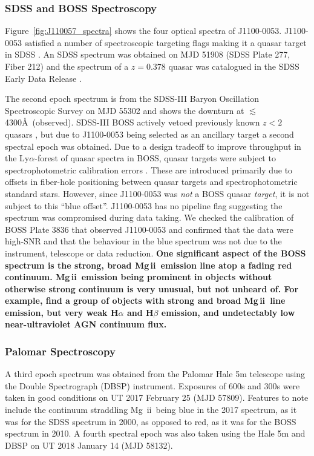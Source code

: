 \documentclass[a4paper,fleqn,usenatbib]{mnras}
\begin{document}
\subsubsection{SDSS and BOSS Spectroscopy}

Figure~\ref{fig:J110057_spectra} shows the four optical spectra of
J1100-0053. J1100-0053 satisfied a number of spectroscopic targeting
flags making it a quasar target in SDSS \citep{Richards2002}. An SDSS
spectrum was obtained on MJD 51908 (SDSS Plate 277, Fiber 212) and the
spectrum of a $z=0.378$ quasar was catalogued in the SDSS Early Data
Release \citep{Stoughton2002, Schneider2002}.

The second epoch spectrum is from the SDSS-III Baryon Oscillation
Spectroscopic Survey \citep[BOSS; ][]{Dawson2013} on MJD 55302 and
shows the downturn at $\lesssim$4300\AA\ (observed). SDSS-III BOSS
actively vetoed previously known $z<2$ quasars \citep{Ross2012}, but
due to J1100-0053 being selected as an ancillary target \citep[via a
white dwarf program;][]{Kepler2015, Kepler2016} a second spectral
epoch was obtained. Due to a design tradeoff to improve throughput in
the Ly$\alpha$-forest of quasar spectra in BOSS, quasar targets were
subject to spectrophotometric calibration errors
\citep{Margala2016}. These are introduced primarily due to offsets in
fiber-hole positioning between quasar targets and spectrophotometric
standard stars. However, since J1100-0053 was {\it not} a BOSS quasar
{\it target}, it is not subject to this ``blue offset''. J1100-0053
has no pipeline flag suggesting the spectrum was compromised during
data taking. We checked the calibration of BOSS Plate 3836 that
observed J1100-0053 and confirmed that the data were high-SNR and that
the behaviour in the blue spectrum was not due to the instrument,
telescope or data reduction.  {\bf One significant aspect of the BOSS
spectrum is the strong, broad Mg\,{\sc ii}\ emission line atop a
fading red continuum.  Mg\,{\sc ii}\ emission being prominent in
objects without otherwise strong continuum is very unusual, but not
unheard of.  For example, \citet{Roig2014} find a group of objects
with strong and broad Mg\,{\sc ii}\ line emission, but very weak
H$\alpha$ and H$\beta$ emission, and undetectably low near-ultraviolet
AGN continuum flux.}

\subsubsection{Palomar Spectroscopy} 
A third epoch spectrum was obtained from the Palomar Hale 5m telescope
using the Double Spectrograph (DBSP) instrument.  Exposures of 600s
and 300s were taken in good conditions on UT 2017 February 25 (MJD
57809). Features to note include the continuum straddling Mg\,{\sc
ii}\ being blue in the 2017 spectrum, as it was for the SDSS spectrum
in 2000, as opposed to red, as it was for the BOSS spectrum in 2010. A
fourth spectral epoch was also taken using the Hale 5m and DBSP on
UT 2018 January 14 (MJD 58132). 
\end{document}
